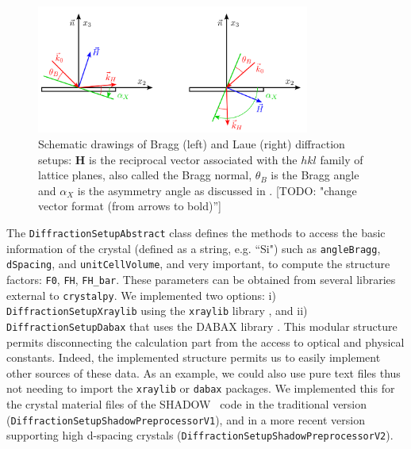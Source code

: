 \documentclass[preprint]{iucr}              %
\newcommand{\todo}[1]{{\color{red}[TODO: "#1'']}}
\begin{document}
\begin{figure}
    \centering
    \includegraphics[width=0.8\textwidth]{figures/edo_sketch.png}
    \caption{Schematic drawings of Bragg (left) and Laue (right) diffraction setups: \textbf{H} is the reciprocal vector associated with the $hkl$ family of lattice planes, also called the Bragg normal, $\theta_B$ is the Bragg angle and $\alpha_X$ is the asymmetry angle as discussed in \cite{codeCRYSTAL}.
    \todo{change vector format (from arrows to bold)} }
    \label{fig:edo_sketch}
\end{figure}

The {\tt DiffractionSetupAbstract} class defines the methods to access the basic information of the crystal (defined as a string, e.g. ``Si") such as {\tt angleBragg}, {\tt dSpacing}, and {\tt unitCellVolume}, and very important, to compute the structure factors: {\tt F0}, {\tt FH}, {\tt FH\_bar}. These parameters can be obtained from several libraries external to {\tt crystalpy}. We implemented two options: i) {\tt DiffractionSetupXraylib} using the {\tt xraylib} library \cite{xraylib}, and ii) {\tt DiffractionSetupDabax} that uses the DABAX library \cite{dabax}. This modular structure permits disconnecting the calculation part from the access to optical and physical constants. Indeed, the implemented structure permits us to easily implement other sources of these data. As an example, we could also use pure text files thus not needing to import the {\tt xraylib} or {\tt dabax} packages. We implemented this for the crystal material files of the SHADOW~\cite{codeSHADOW} code in the traditional version ({\tt DiffractionSetupShadowPreprocessorV1}), and in a more recent version \cite{Yu2022} supporting high d-spacing crystals ({\tt DiffractionSetupShadowPreprocessorV2}).

\end{document}

